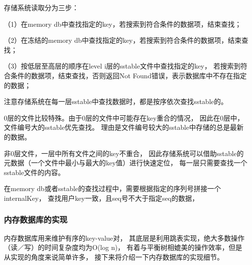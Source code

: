 \begin{enumerate}
		存储系统读取分为三步：

		（1）在memory db中查找指定的key，若搜索到符合条件的数据项，结束查找；

		（2）在冻结的memory db中查找指定的key，若搜索到符合条件的数据项，结束查找；
		
		（3）按低层至高层的顺序在level i层的sstable文件中查找指定的key，
		若搜索到符合条件的数据项，结束查找，否则返回Not Found错误，表示数据库中不存在指定的数据；

		注意存储系统在每一层sstable中查找数据时，都是按序依次查找sstable的。

		0层的文件比较特殊。由于0层的文件中可能存在key重合的情况，
		因此在0层中，文件编号大的sstable优先查找。
		理由是文件编号较大的sstable中存储的总是最新的数据。

		非0层文件，一层中所有文件之间的key不重合，
		因此存储系统可以借助sstable的元数据（一个文件中最小与最大的key值）进行快速定位，
		每一层只需要查找一个sstable文件的内容。

		在memory db或者sstable的查找过程中，需要根据指定的序列号拼接一个internalKey，
		查找用户key一致，且seq号不大于指定seq的数据，
		
	\end{enumerate}
	
	\subsubsection{内存数据库的实现}

	内存数据库用来维护有序的key-value对，
		其底层是利用跳表实现，绝大多数操作（读／写）的时间复杂度均为O(log n)，
		有着与平衡树相媲美的操作效率，但是从实现的角度来说简单许多，
		接下来将介绍一下内存数据库的实现细节。

